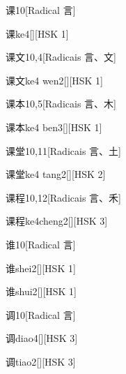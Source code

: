 \begin{entry}{课}{10}[Radical ⾔]
  \begin{phonetics}{课}{ke4}[][HSK 1]
  \end{phonetics}
\end{entry}

\begin{entry}{课文}{10,4}[Radicais ⾔、⽂]
  \begin{phonetics}{课文}{ke4 wen2}[][HSK 1]
  \end{phonetics}
\end{entry}

\begin{entry}{课本}{10,5}[Radicais ⾔、⽊]
  \begin{phonetics}{课本}{ke4 ben3}[][HSK 1]
  \end{phonetics}
\end{entry}

\begin{entry}{课堂}{10,11}[Radicais ⾔、⼟]
  \begin{phonetics}{课堂}{ke4 tang2}[][HSK 2]
  \end{phonetics}
\end{entry}

\begin{entry}{课程}{10,12}[Radicais ⾔、⽲]
  \begin{phonetics}{课程}{ke4cheng2}[][HSK 3]
  \end{phonetics}
\end{entry}

\begin{entry}{谁}{10}[Radical ⾔]
  \begin{phonetics}{谁}{shei2}[][HSK 1]
  \end{phonetics}
  \begin{phonetics}{谁}{shui2}[][HSK 1]
  \end{phonetics}
\end{entry}

\begin{entry}{调}{10}[Radical ⾔]
  \begin{phonetics}{调}{diao4}[][HSK 3]
  \end{phonetics}
  \begin{phonetics}{调}{tiao2}[][HSK 3]
  \end{phonetics}
\end{entry}

